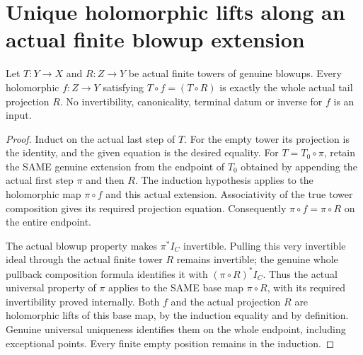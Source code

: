 \section{Unique holomorphic lifts along an actual finite blowup extension}

\begin{theorem}
\label{hir:actual-tower-tail-holomorphic-lift-uniqueness}
\leanok
Let $T:Y\to X$ and $R:Z\to Y$ be actual finite towers of genuine blowups.
Every holomorphic $f:Z\to Y$ satisfying $T\circ f=(T\circ R)$ is exactly
the whole actual tail projection $R$. No invertibility, canonicality,
terminal datum or inverse for $f$ is an input.
\end{theorem}
\begin{proof}
Induct on the actual last step of $T$. For the empty tower its projection
is the identity, and the given equation is the desired equality.
For $T=T_0\circ\pi$, retain the SAME genuine extension from the endpoint
of $T_0$ obtained by appending the actual first step $\pi$ and then $R$.
The induction hypothesis applies to the holomorphic map $\pi\circ f$ and
this actual extension. Associativity of the true tower composition gives
its required projection equation. Consequently
$\pi\circ f=\pi\circ R$ on the entire endpoint.

The actual blowup property makes $\pi^*I_C$ invertible. Pulling this very
invertible ideal through the actual finite tower $R$ remains invertible;
the genuine whole pullback composition formula identifies it with
$(\pi\circ R)^*I_C$. Thus the actual universal property of $\pi$ applies
to the SAME base map $\pi\circ R$, with its required invertibility proved
internally. Both $f$ and the actual projection $R$ are holomorphic lifts
of this base map, by the induction equality and by definition. Genuine
universal uniqueness identifies them on the whole endpoint, including
exceptional points. Every finite empty position remains in the induction.
\end{proof}
